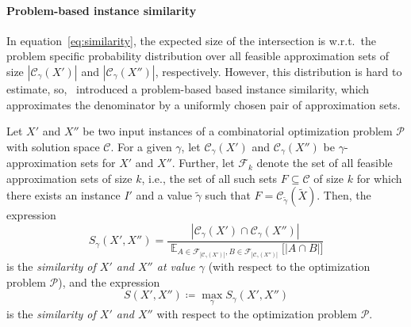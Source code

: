 \paragraph{Problem-based instance similarity}
In equation~\eqref{eq:similarity}, the expected size of the intersection is
w.r.t.\  the problem specific probability distribution over all feasible
approximation sets of size $|{\mathcal{C}_\gamma}(X')|$ and
$|{\mathcal{C}_\gamma}(X'')|$, respectively. However, this distribution is hard
to estimate, so,~\citet{Sramek:PhD} introduced a problem-based based instance
similarity, which approximates the denominator by a uniformly chosen pair of
approximation sets.
%
\begin{definition}
  Let $X'$ and $X''$ be two input instances of a combinatorial optimization
  problem $\mathcal{P}$ with solution space $\mathcal{C}$. For a given $\gamma$,
  let ${\mathcal{C}_\gamma}(X')$ and ${\mathcal{C}_\gamma}(X'')$ be $\gamma$-approximation sets for $X'$
  and $X''$. Further, let $\mathcal{F}_k$ denote the set of all feasible
  approximation sets of size $k$, i.e., the set of all such sets $F\subseteq
  \mathcal{C}$ of size $k$ for which there exists an instance $I'$ and
  a value $\tilde \gamma$ such that $F=\mathcal{C}_{\tilde \gamma}(\tilde X)$. Then, the expression
  \begin{equation}
    \label{eq:generic_similarity}
    S_\gamma(X',X'') = \frac{|{\mathcal{C}_\gamma}(X')\cap {\mathcal{C}_\gamma}(X'')|}
      {\mathop{\mathbb{E}}_{A\in \mathcal{F}_{|{\mathcal{C}_\gamma}(X')|}, B\in
      \mathcal{F}_{|{\mathcal{C}_\gamma}(X'')|}}{\big[|A\cap B|\big]}}
  \end{equation}
  is the \emph{similarity of $X'$ and $X''$ at value $\gamma$} (with respect to
  the optimization problem $\mathcal{P}$), and the expression
  \begin{equation}
    \label{def:S}
    S(X',X'') \coloneqq \max_\gamma S_\gamma(X',X'')
  \end{equation}
  is the \emph{similarity of $X'$ and $X''$} with respect to the optimization
  problem $\mathcal{P}$.
\end{definition}
%

